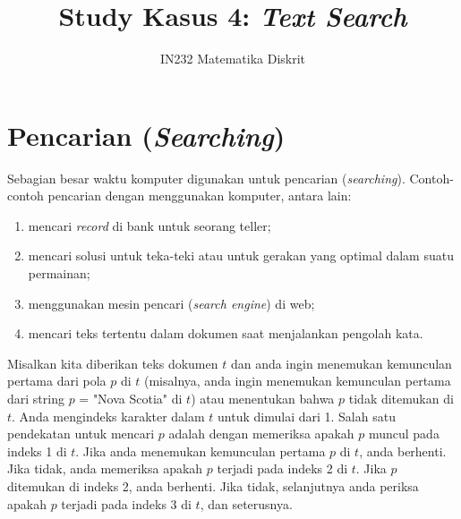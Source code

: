 \documentclass{article}
\title{Study Kasus 4: \textit{Text Search}}
\author{IN232 Matematika Diskrit}
\date{}
\theoremstyle{plain}
\begin{document}
\maketitle


\section*{Pencarian (\textit{Searching})}
Sebagian besar waktu komputer digunakan untuk pencarian (\textit{searching}). Contoh-contoh pencarian dengan menggunakan komputer, antara lain:
	\begin{enumerate}[-,topsep=0pt, nosep,label=\alph*. ]
		\item mencari \textit{record} di bank untuk seorang teller;
		\item mencari solusi untuk teka-teki atau untuk gerakan yang optimal dalam suatu permainan;
		\item menggunakan mesin pencari (\textit{search engine}) di web;
		\item mencari teks tertentu dalam dokumen saat menjalankan pengolah kata.
	\end{enumerate}

\bigskip
\noindent Misalkan kita diberikan teks dokumen $t$ dan anda ingin menemukan kemunculan pertama dari pola $p$ di $t$ (misalnya, anda ingin menemukan kemunculan pertama dari string $p$ = "Nova Scotia" di $t$) atau menentukan bahwa $p$ tidak ditemukan di $t$. Anda mengindeks karakter dalam $t$ untuk dimulai dari 1. Salah satu pendekatan untuk mencari $p$ adalah dengan memeriksa apakah $p$ muncul pada indeks 1 di $t$. Jika anda menemukan kemunculan pertama $p$ di $t$, anda berhenti. Jika tidak, anda memeriksa apakah $p$ terjadi pada indeks 2 di $t$. Jika $p$ ditemukan di indeks 2, anda berhenti. Jika tidak, selanjutnya anda periksa apakah $p$ terjadi pada indeks 3 di $t$, dan seterusnya.
\end{document}
